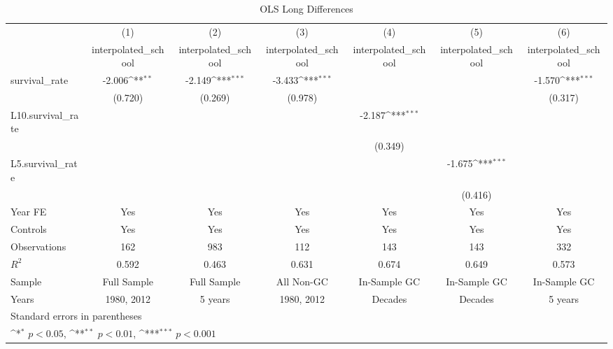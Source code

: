 \begin{table}[htbp]\centering
\def\sym#1{\ifmmode^{#1}\else\(^{#1}\)\fi}
\caption{OLS Long Differences}
\begin{tabular}{l*{6}{c}}
\toprule
                &\multicolumn{1}{c}{(1)}&\multicolumn{1}{c}{(2)}&\multicolumn{1}{c}{(3)}&\multicolumn{1}{c}{(4)}&\multicolumn{1}{c}{(5)}&\multicolumn{1}{c}{(6)}\\
                &\multicolumn{1}{c}{interpolated\_school}&\multicolumn{1}{c}{interpolated\_school}&\multicolumn{1}{c}{interpolated\_school}&\multicolumn{1}{c}{interpolated\_school}&\multicolumn{1}{c}{interpolated\_school}&\multicolumn{1}{c}{interpolated\_school}\\
\midrule
survival\_rate   &   -2.006\sym{**} &   -2.149\sym{***}&   -3.433\sym{***}&                  &                  &   -1.570\sym{***}\\
                &  (0.720)         &  (0.269)         &  (0.978)         &                  &                  &  (0.317)         \\
\addlinespace
L10.survival\_rate&                  &                  &                  &   -2.187\sym{***}&                  &                  \\
                &                  &                  &                  &  (0.349)         &                  &                  \\
\addlinespace
L5.survival\_rate&                  &                  &                  &                  &   -1.675\sym{***}&                  \\
                &                  &                  &                  &                  &  (0.416)         &                  \\
\addlinespace
Year FE         &      Yes         &      Yes         &      Yes         &      Yes         &      Yes         &      Yes         \\
\addlinespace
Controls        &      Yes         &      Yes         &      Yes         &      Yes         &      Yes         &      Yes         \\
\midrule
Observations    &      162         &      983         &      112         &      143         &      143         &      332         \\
\(R^{2}\)       &    0.592         &    0.463         &    0.631         &    0.674         &    0.649         &    0.573         \\
Sample          &Full Sample         &Full Sample         &All Non-GC         &In-Sample GC         &In-Sample GC         &In-Sample GC         \\
Years           &1980, 2012         &  5 years         &1980, 2012         &  Decades         &  Decades         &  5 years         \\
\bottomrule
\multicolumn{7}{l}{\footnotesize Standard errors in parentheses}\\
\multicolumn{7}{l}{\footnotesize \sym{*} \(p<0.05\), \sym{**} \(p<0.01\), \sym{***} \(p<0.001\)}\\
\end{tabular}
\end{table}
